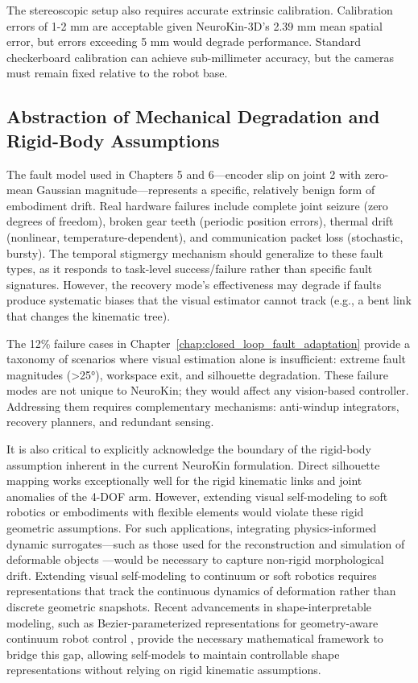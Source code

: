 \documentclass[12pt,a4paper,oneside]{report}
\begin{document}
The stereoscopic setup also requires accurate extrinsic calibration. Calibration errors of 1-2 mm are acceptable given NeuroKin-3D's 2.39 mm mean spatial error, but errors exceeding 5 mm would degrade performance. Standard checkerboard calibration can achieve sub-millimeter accuracy, but the cameras must remain fixed relative to the robot base.

\subsection{Abstraction of Mechanical Degradation and Rigid-Body Assumptions}
\label{subsec:abstraction_of_mechanical_degradation_and_rigid_body_assumptions}

The fault model used in Chapters 5 and 6—encoder slip on joint 2 with zero-mean Gaussian magnitude—represents a specific, relatively benign form of embodiment drift. Real hardware failures include complete joint seizure (zero degrees of freedom), broken gear teeth (periodic position errors), thermal drift (nonlinear, temperature-dependent), and communication packet loss (stochastic, bursty). The temporal stigmergy mechanism should generalize to these fault types, as it responds to task-level success/failure rather than specific fault signatures. However, the recovery mode's effectiveness may degrade if faults produce systematic biases that the visual estimator cannot track (e.g., a bent link that changes the kinematic tree).

The 12\% failure cases in Chapter~\ref{chap:closed_loop_fault_adaptation} provide a taxonomy of scenarios where visual estimation alone is insufficient: extreme fault magnitudes (>25°), workspace exit, and silhouette degradation. These failure modes are not unique to NeuroKin; they would affect any vision-based controller. Addressing them requires complementary mechanisms: anti-windup integrators, recovery planners, and redundant sensing.

It is also critical to explicitly acknowledge the boundary of the rigid-body assumption inherent in the current NeuroKin formulation. Direct silhouette mapping works exceptionally well for the rigid kinematic links and joint anomalies of the 4-DOF arm. However, extending visual self-modeling to soft robotics or embodiments with flexible elements would violate these rigid geometric assumptions. For such applications, integrating physics-informed dynamic surrogates—such as those used for the reconstruction and simulation of deformable objects \cite{jiang2024phystwin}—would be necessary to capture non-rigid morphological drift. Extending visual self-modeling to continuum or soft robotics requires representations that track the continuous dynamics of deformation rather than discrete geometric snapshots. Recent advancements in shape-interpretable modeling, such as Bezier-parameterized representations for geometry-aware continuum robot control \cite{yu2024shape}, provide the necessary mathematical framework to bridge this gap, allowing self-models to maintain controllable shape representations without relying on rigid kinematic assumptions.
\end{document}

